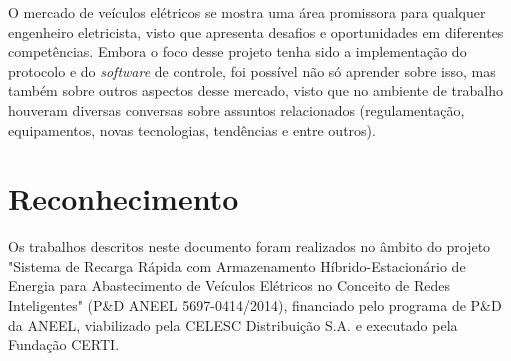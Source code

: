   O mercado de veículos elétricos se mostra uma área promissora para qualquer engenheiro eletricista, visto que apresenta desafios e oportunidades em diferentes competências. Embora o foco desse projeto tenha sido a implementação do protocolo e do \textit{software} de controle, foi possível não só aprender sobre isso, mas também sobre outros aspectos desse mercado, visto que no ambiente de trabalho houveram diversas conversas sobre assuntos relacionados (regulamentação, equipamentos, novas tecnologias, tendências e entre outros).

  \section{Reconhecimento}
  
    Os trabalhos descritos neste documento foram realizados no âmbito do projeto "Sistema de Recarga Rápida com Armazenamento Híbrido-Estacionário de Energia para Abastecimento de Veículos Elétricos no Conceito de Redes Inteligentes" (P\&D ANEEL 5697-0414/2014), financiado pelo programa de P\&D da ANEEL, viabilizado pela CELESC Distribuição S.A. e executado pela Fundação CERTI.
  